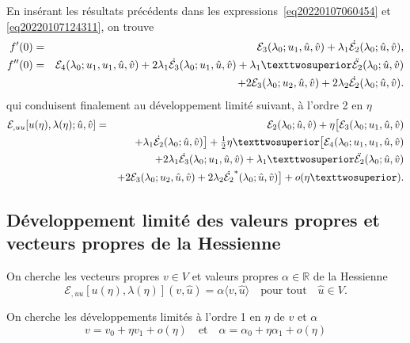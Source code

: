 \documentclass[12pt, final]{amsart}
\begin{document}
En insérant les résultats précédents dans les
expressions~\eqref{eq20220107060454} et \eqref{eq20220107124311}, on trouve
\begin{eqnarray}
  f'(0)&=&\mathcal E_3(\lambda _0; u_1, \hat{u}, \hat{v})
            +\lambda _1\dot{\mathcal E_2}(\lambda _0; \hat{u}, \hat{v}),\\
  \notag
  f''(0)&=&\mathcal E_4(\lambda _0; u_1, u_1, \hat{u}, \hat{v})
             +2\lambda _1\dot{\mathcal E_3}(\lambda _0; u_1, \hat{u}, \hat{v})
             +\lambda _1²\ddot{\mathcal E_2}(\lambda _0; \hat{u}, \hat{v})\\
          &&+2\mathcal E_3(\lambda _0; u_2, \hat{u}, \hat{v})
            +2\lambda _2\dot{\mathcal E_2}(\lambda _0; \hat{u}, \hat{v}).
\end{eqnarray}
qui conduisent finalement au développement limité suivant, à l'ordre 2 en \(\eta \)
\begin{eqnarray}
  \notag
  \mathcal E_{,uu}[u(\eta ), \lambda (\eta ); \hat{u}, \hat{v}]
  &=&\mathcal E_2(\lambda _0; \hat{u}, \hat{v})+\eta \bigl[\mathcal E_3(\lambda _0; u_1, \hat{u}, \hat{v})\\
  \notag
  &&+\lambda _1\dot{\mathcal E_2}(\lambda _0; \hat{u}, \hat{v})\bigr]+\tfrac12\eta ²\bigl[\mathcal E_4(\lambda _0; u_1, u_1, \hat{u}, \hat{v})\\
  \notag
  &&+2\lambda _1\dot{\mathcal E_3}(\lambda _0; u_1, \hat{u}, \hat{v})+\lambda _1²\ddot{\mathcal E_2}(\lambda _0; \hat{u}, \hat{v})\\
  &&+2\mathcal E_3(\lambda _0; u_2, \hat{u}, \hat{v})+2\lambda _2\dot{\mathcal E_2}^*(\lambda _0; \hat{u}, \hat{v})\bigr]+o(\eta ²).
\end{eqnarray}

\subsection{Développement limité des valeurs propres et vecteurs propres de la Hessienne}

On cherche les vecteurs propres \(v\in V\) et valeurs propres \(\alpha\in\mathbb R \) de la
Hessienne
\begin{equation}
  \label{eq20211115082122}
  \mathcal E_{,uu}[u(\eta ), \lambda (\eta )](v, \hat{u})=\alpha\langle v, \hat{u}\rangle \quad\text{pour tout}\quad\hat{u}\in V.
\end{equation}

On cherche les développements limités à l'ordre 1 en \(\eta \) de \(v\) et \(\alpha\)
\begin{equation}
  \label{eq20211115082037}
  v = v_0+\eta  v_1+o(\eta )\quad\text{et}\quad\alpha=\alpha_0+\eta \alpha_1+o(\eta )
\end{equation}
\end{document}
